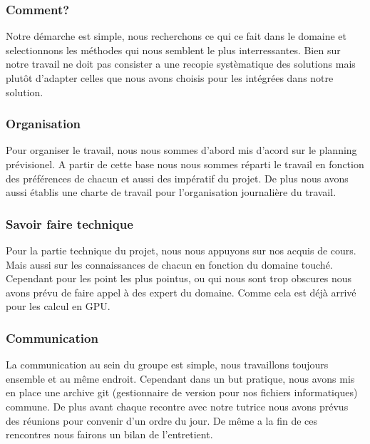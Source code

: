 \documentclass[a4paper,10pt]{article}
\begin{document}
\subsubsection{Comment?}
Notre démarche est simple, nous recherchons ce qui ce fait dans le
domaine et selectionnons les méthodes qui nous semblent le plus
interressantes. Bien sur notre travail ne doit pas consister a une
recopie systèmatique des solutions mais plutôt d'adapter celles que
nous avons choisis pour les intégrées dans notre solution.\\

\subsubsection{Organisation}
Pour organiser le travail, nous nous sommes d'abord mis d'acord sur le
planning prévisionel. A partir de cette base nous nous sommes réparti
le travail en fonction des préférences de chacun et aussi des
impératif du projet. De plus nous avons aussi établis une charte de
travail pour l'organisation journalière du travail.\\

\subsubsection{Savoir faire technique}
Pour la partie technique du projet, nous nous appuyons sur nos acquis
de cours. Mais aussi sur les connaissances de chacun en fonction du
domaine touché.\\ Cependant pour les point les plus pointus, ou qui
nous sont trop obscures nous avons prévu de faire appel à des expert
du domaine. Comme cela est déjà arrivé pour les calcul en GPU.

\subsubsection{Communication}
La communication au sein du groupe est simple, nous travaillons
toujours ensemble et au même endroit. Cependant dans un but pratique,
nous avons mis en place une archive git (gestionnaire de version pour
nos fichiers informatiques) commune. De plus avant chaque recontre
avec notre tutrice nous avons prévus des réunions pour convenir d'un
ordre du jour. De même a la fin de ces rencontres nous fairons un
bilan de l'entretient.
\end{document}
